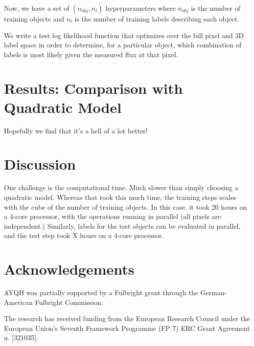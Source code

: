 \documentclass[12pt, preprint]{aastex}
\begin{document}
Now, we have a set of $(n_{obj}, n_{l})$ hyperparameters where $n_{obj}$ is 
the number of training objects and $n_{l}$ is the number of training labels 
describing each object.

We write a test log likelihood function that optimizes over the full pixel 
and 3D label space in order to determine, for a particular object, which 
combination of labels is most likely given the measured flux at that pixel.








\section{Results: Comparison with Quadratic Model}

Hopefully we find that it's a hell of a lot better!

\section{Discussion}

One challenge is the computational time. Much slower than simply choosing 
a quadratic model. Whereas that took this much time, the training steps scales 
with the cube of the number of training objects. In this case, it took 20 
hours on a 4-core processor, with the operations running in parallel (all 
pixels are independent.) Similarly, labels for the test objects can be 
evaluated in parallel, and the test step took X hours on a 4-core processor. 

\section{Acknowledgements}

AYQH was partially supported by a Fulbright grant through the German-American
Fulbright Commission.

The research has received funding from the European Research Council under the
European Union's Seventh Framework Programme (FP 7) ERC Grant Agreement n.
[321035].


\end{document}
